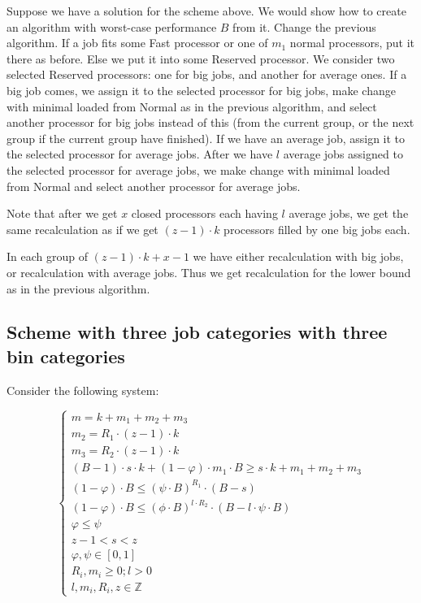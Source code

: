 \documentclass[a4paper, preprint, authoryear]{elsarticle}
\begin{document}
Suppose we have a solution for the scheme above. 
We would show how to create an algorithm with worst-case performance $B$ from it.
Change the previous algorithm. 
If a job fits some Fast processor or one of $m_1$ normal processors, 
put it there as before. 
Else we put it into some Reserved processor. We consider two selected Reserved
processors: one for big jobs, and another for average ones.
If a big job comes, we assign it to the selected processor for big jobs, 
make change with minimal loaded from Normal as in the previous algorithm, 
and select another processor for big jobs instead of this 
(from the current group, or the next group if the current group have finished).
If we have an average job, assign it to the selected processor for average jobs.
After we have $l$ average jobs assigned to the selected processor for average jobs,
we make change with minimal loaded from Normal and select another processor for
average jobs.

Note that after we get $x$ closed processors each having $l$ average jobs, 
we get the same recalculation as if we get $(z - 1) \cdot k$ 
processors filled by one big jobs each.

In each group of $(z - 1) \cdot k + x - 1$ we have either recalculation with big jobs, or recalculation with average jobs. 
Thus we get recalculation for the lower bound as in the previous algorithm.

\subsection*{Scheme with three job categories with three bin categories}

Consider the following system:

\begin{equation}
    \begin{cases}
        m = k + m_1 + m_2 + m_3 \\
        m_2 = R_1 \cdot (z - 1) \cdot k \\
        m_3 = R_2 \cdot (z - 1) \cdot k \\
        (B - 1) \cdot s \cdot k  + (1 - \varphi) \cdot m_1 \cdot B \geq s \cdot k + m_1 + m_2 + m_3 \\
        (1 - \varphi) \cdot B \leq (\psi \cdot B)^{R_1} \cdot (B - s) \\
        (1 - \varphi) \cdot B \leq (\phi \cdot B)^{l \cdot R_2} \cdot (B - l \cdot \psi \cdot B) \\
        \varphi \leq \psi \\
        z - 1 < s < z \\
        \varphi, \psi \in [0,1] \\
        R_i, m_i \geq 0; l > 0 \\
        l, m_i, R_i, z \in \mathbb{Z}
    \end{cases}
\end{equation}
\end{document}
